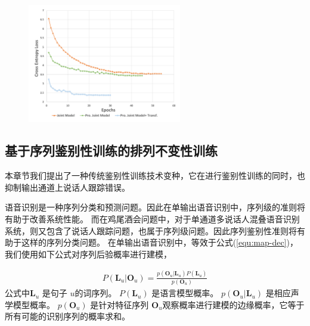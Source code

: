 \begin{figure}[htb]
  \centering
    \captionstyle{\centering}
    \includegraphics[width=0.6\textwidth]{figure/tr-curve.pdf}
\end{figure}

\subsection{基于序列鉴别性训练的排列不变性训练}
\label{chap:intro2-pit-dt}

本章节我们提出了一种传统鉴别性训练技术变种，它在进行鉴别性训练的同时，也抑制输出通道上说话人跟踪错误。

语音识别是一种序列分类和预测问题。因此在单输出语音识别中，序列级的准则将有助于改善系统性能。
而在鸡尾酒会问题中，对于单通道多说话人混叠语音识别系统，则又包含了说话人跟踪问题，也属于序列级问题。因此序列鉴别性准则将有助于这样的序列分类问题。
在单输出语音识别中，等效于公式(\ref{equ:map-dec})，我们使用如下公式对序列后验概率进行建模，

  
\begin{equation}
\label{equ:single-mbr}
\begin{split}
P(\mathbf{L}_u|\mathbf{O}_u)=\frac {p(\mathbf{O}_u|\mathbf{L}_u)P(\mathbf{L}_u)}{p(\mathbf{O}_u)}  
\end{split}
\end{equation}
公式中$\mathbf{L}_u$ 是句子 $u$的词序列。 $P(\mathbf{L}_u)$ 是语言模型概率。
$p(\mathbf{O}_u|\mathbf{L}_u)$ 是相应声学模型概率。
 $p(\mathbf{O}_u)$ 是针对特征序列 $\mathbf{O}_u$观察概率进行建模的边缘概率，它等于所有可能的识别序列的概率求和。


